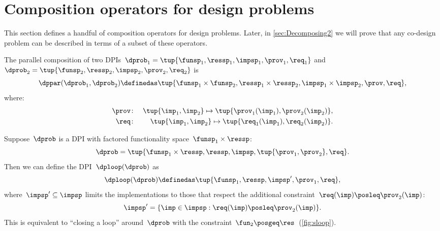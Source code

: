 \section{Composition operators for design problems}

This section defines a handful of composition operators for design
problems. Later, in \cref{sec:Decomposing2} we will prove that any co-design
problem can be described in terms of a subset of these operators.

\label{sec:threeoperators}

\begin{definition}[$\dppar$]
  \label{def:parallel}
  The parallel composition of two DPIs~$\dprob_{1}=\tup{\funsp_{1},\ressp_{1},\impsp_{1},\prov_{1},\req_{1}}$
  and~$\dprob_{2}=\tup{\funsp_{2},\ressp_{2},\impsp_{2},\prov_{2},
  \req_{2}}$ is
  \begin{equation*}
    \dppar(\dprob_{1},\dprob_{2})\definedas\tup{\funsp_{1}\times\funsp_{2},\ressp_{1}\times\ressp_{2},\impsp_{1}\times\impsp_{2},\prov,\req} ,
  \end{equation*}
  where:
  \begin{eqnarray}
    \prov & \colon & \tup{ \imp_{1},\imp_{2}} \mapsto \tup{\prov_{1}(\imp_{1}),\prov_{2}(\imp_{2})} ,\label{eq:dppar-exec}\\
    \req & \colon & \tup{ \imp_{1},\imp_{2}}\mapsto\tup{\req_{1}(\imp_{1}),\req_{2}(\imp_{2})} .\nonumber
  \end{eqnarray}

\end{definition}


\begin{definition}[$\dploop$]
  \label{def:dp_loop}Suppose~$\dprob$ is a DPI with factored functionality
  space~$\funsp_{1}\times\ressp$:
  \begin{equation*}
    \dprob=\tup{ \funsp_{1}\times\ressp,\ressp,\impsp,\tup{ \prov_{1},\prov_{2}} ,\req}.
  \end{equation*}
  Then we can define the DPI~$\dploop(\dprob)$ as
  \begin{equation*}
    \dploop(\dprob)\definedas\tup{ \funsp_{1},\ressp,\impsp',\prov_{1},\req} ,
  \end{equation*}
  where~$\impsp'\subseteq\impsp$ limits the implementations to those
  that respect the additional constraint~$\req(\imp)\posleq\prov_{2}(\imp)$:
  \begin{equation*}
    \impsp'=\{\imp\in\impsp:\req(\imp)\posleq\prov_{2}(\imp)\}.
  \end{equation*}
  This is equivalent to ``closing a loop'' around~$\dprob$ with
  the constraint~$\fun_{2}\posgeq\res$~(\cref{fig:sloop}).
\end{definition}

